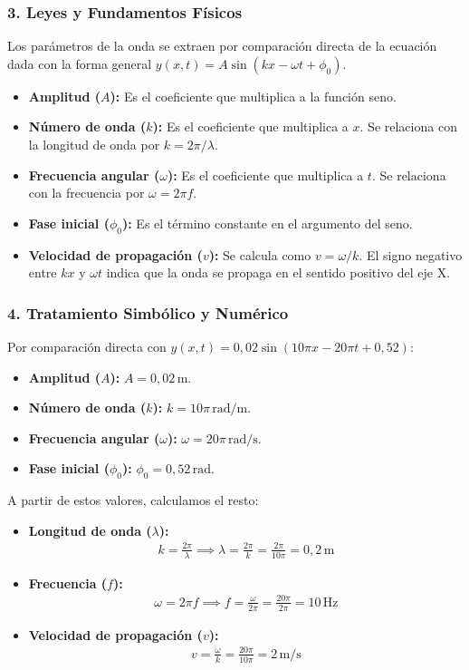 \subsubsection*{3. Leyes y Fundamentos Físicos}
Los parámetros de la onda se extraen por comparación directa de la ecuación dada con la forma general $y(x,t) = A \sin(kx - \omega t + \phi_0)$.
\begin{itemize}
    \item \textbf{Amplitud ($A$):} Es el coeficiente que multiplica a la función seno.
    \item \textbf{Número de onda ($k$):} Es el coeficiente que multiplica a $x$. Se relaciona con la longitud de onda por $k = 2\pi/\lambda$.
    \item \textbf{Frecuencia angular ($\omega$):} Es el coeficiente que multiplica a $t$. Se relaciona con la frecuencia por $\omega = 2\pi f$.
    \item \textbf{Fase inicial ($\phi_0$):} Es el término constante en el argumento del seno.
    \item \textbf{Velocidad de propagación ($v$):} Se calcula como $v = \omega/k$. El signo negativo entre $kx$ y $\omega t$ indica que la onda se propaga en el sentido positivo del eje X.
\end{itemize}

\subsubsection*{4. Tratamiento Simbólico y Numérico}
Por comparación directa con $y(x,t) = 0,02 \sin(10\pi x - 20\pi t + 0,52)$:
\begin{itemize}
    \item \textbf{Amplitud ($A$):} $A = 0,02 \, \text{m}$.
    \item \textbf{Número de onda ($k$):} $k = 10\pi \, \text{rad/m}$.
    \item \textbf{Frecuencia angular ($\omega$):} $\omega = 20\pi \, \text{rad/s}$.
    \item \textbf{Fase inicial ($\phi_0$):} $\phi_0 = 0,52 \, \text{rad}$.
\end{itemize}
A partir de estos valores, calculamos el resto:
\begin{itemize}
    \item \textbf{Longitud de onda ($\lambda$):}
    \begin{gather}
        k = \frac{2\pi}{\lambda} \implies \lambda = \frac{2\pi}{k} = \frac{2\pi}{10\pi} = 0,2 \, \text{m}
    \end{gather}
    \item \textbf{Frecuencia ($f$):}
    \begin{gather}
        \omega = 2\pi f \implies f = \frac{\omega}{2\pi} = \frac{20\pi}{2\pi} = 10 \, \text{Hz}
    \end{gather}
    \item \textbf{Velocidad de propagación ($v$):}
    \begin{gather}
        v = \frac{\omega}{k} = \frac{20\pi}{10\pi} = 2 \, \text{m/s}
    \end{gather}
\end{itemize}

